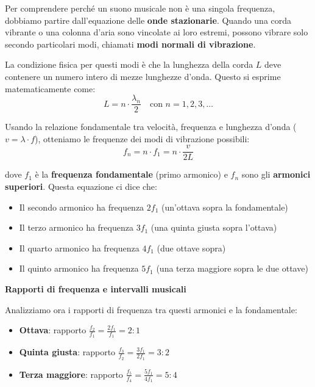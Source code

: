 \begin{fisica}
	\label{phys:serie_armonici_fondamento}
	
	Per comprendere perché un suono musicale non è una singola frequenza, dobbiamo partire dall'equazione delle \textbf{onde stazionarie}. Quando una corda vibrante o una colonna d'aria sono vincolate ai loro estremi, possono vibrare solo secondo particolari modi, chiamati \textbf{modi normali di vibrazione}.
	
	La condizione fisica per questi modi è che la lunghezza della corda $L$ deve contenere un numero intero di mezze lunghezze d'onda. Questo si esprime matematicamente come:
	\[
	L = n \cdot \frac{\lambda_n}{2} \quad \text{con } n = 1, 2, 3, \ldots
	\]
	
	Usando la relazione fondamentale tra velocità, frequenza e lunghezza d'onda ($v = \lambda \cdot f$), otteniamo le frequenze dei modi di vibrazione possibili:
	\[
	f_n = n \cdot f_1 = n \cdot \frac{v}{2L}
	\]
	
	dove $f_1$ è la \textbf{frequenza fondamentale} (primo armonico) e $f_n$ sono gli \textbf{armonici superiori}. Questa equazione ci dice che:
	\begin{itemize}
		\item Il secondo armonico ha frequenza $2f_1$ (un'ottava sopra la fondamentale)
		\item Il terzo armonico ha frequenza $3f_1$ (una quinta giusta sopra l'ottava)
		\item Il quarto armonico ha frequenza $4f_1$ (due ottave sopra)
		\item Il quinto armonico ha frequenza $5f_1$ (una terza maggiore sopra le due ottave)
	\end{itemize}
	
	\textbf{Rapporti di frequenza e intervalli musicali}
	
	Analizziamo ora i rapporti di frequenza tra questi armonici e la fondamentale:
	\begin{itemize}
		\item \textbf{Ottava}: rapporto $\frac{f_2}{f_1} = \frac{2f_1}{f_1} = 2:1$
		\item \textbf{Quinta giusta}: rapporto $\frac{f_3}{f_2} = \frac{3f_1}{2f_1} = 3:2$
		\item \textbf{Terza maggiore}: rapporto $\frac{f_5}{f_4} = \frac{5f_1}{4f_1} = 5:4$
	\end{itemize}
	

\end{fisica}
